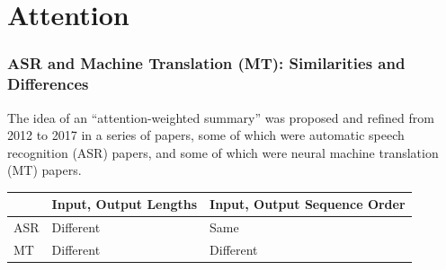\documentclass{beamer}
\begin{document}
\section{Attention}
\setcounter{subsection}{1}

\begin{frame}
  \frametitle{ASR and Machine Translation (MT): Similarities and Differences}

  The idea of an ``attention-weighted summary'' was proposed and
  refined from 2012 to 2017 in a series of papers, some of which were
  automatic speech recognition (ASR) papers, and some of which were
  neural machine translation (MT) papers.

  \begin{center}
    \begin{tabular}{|l|l|l|}\hline
      & Input, Output Lengths & Input, Output Sequence Order \\\hline\hline
      ASR & Different & Same\\\hline
      MT & Different & Different\\\hline
    \end{tabular}
  \end{center}
\end{frame}
\end{document}

